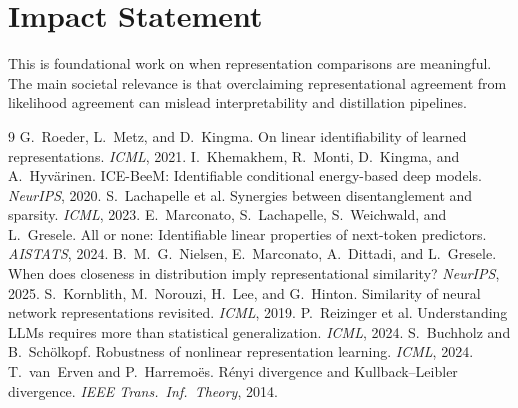 \documentclass[10pt,letterpaper,twocolumn]{article}
\theoremstyle{plain}
\theoremstyle{definition}
\theoremstyle{remark}
\begin{document}
\section*{Impact Statement}
This is foundational work on when representation comparisons are meaningful. The
main societal relevance is that overclaiming representational agreement from
likelihood agreement can mislead interpretability and distillation pipelines.

\small
\begin{thebibliography}{9}
 G.~Roeder, L.~Metz, and D.~Kingma.
  On linear identifiability of learned representations. \emph{ICML}, 2021.
 I.~Khemakhem, R.~Monti, D.~Kingma, and A.~Hyv\"arinen.
  ICE-BeeM: Identifiable conditional energy-based deep models. \emph{NeurIPS}, 2020.
 S.~Lachapelle et al.
  Synergies between disentanglement and sparsity. \emph{ICML}, 2023.
 E.~Marconato, S.~Lachapelle, S.~Weichwald, and L.~Gresele.
  All or none: Identifiable linear properties of next-token predictors.
  \emph{AISTATS}, 2024.
 B.~M.~G.~Nielsen, E.~Marconato, A.~Dittadi, and L.~Gresele.
  When does closeness in distribution imply representational similarity?
  \emph{NeurIPS}, 2025.
 S.~Kornblith, M.~Norouzi, H.~Lee, and G.~Hinton.
  Similarity of neural network representations revisited. \emph{ICML}, 2019.
 P.~Reizinger et al.
  Understanding LLMs requires more than statistical generalization.
  \emph{ICML}, 2024.
 S.~Buchholz and B.~Sch\"olkopf.
  Robustness of nonlinear representation learning. \emph{ICML}, 2024.
 T.~van~Erven and P.~Harremo\"es.
  R\'enyi divergence and Kullback--Leibler divergence.
  \emph{IEEE Trans.\ Inf.\ Theory}, 2014.
\end{thebibliography}
\end{document}
